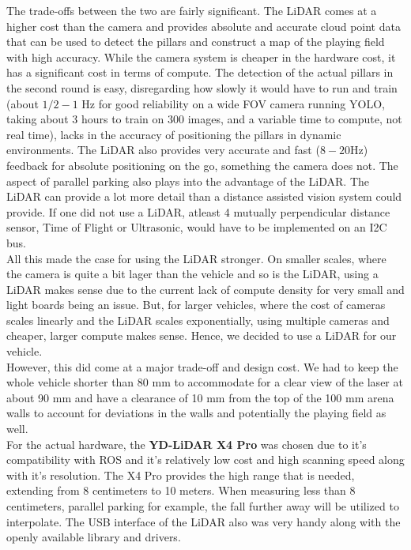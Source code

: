 \documentclass[12pt,a4paper]{article}
\begin{document}
The trade-offs between the two are fairly significant. The LiDAR comes at a higher cost than the camera and provides absolute and accurate cloud point data that can be used to detect the pillars and construct a map of the playing field with high accuracy. While the camera system is cheaper in the hardware cost, it has a significant cost in terms of compute. The detection of the actual pillars in the second round is easy, disregarding how slowly it would have to run and train (about $1/2-1$ Hz for good reliability on a wide FOV camera running YOLO, taking about 3 hours to train on 300 images, and a variable time to compute, not real time), lacks in the accuracy of positioning the pillars in dynamic environments. The LiDAR also provides very accurate and fast ($8-20$Hz) feedback for absolute positioning on the go, something the camera does not. The aspect of parallel parking also plays into the advantage of the LiDAR. The LiDAR can provide a lot more detail than a distance assisted vision system could provide. If one did not use a LiDAR, atleast 4 mutually perpendicular distance sensor, Time of Flight or Ultrasonic, would have to be implemented on an I2C bus. \\

All this made the case for using the LiDAR stronger. On smaller scales, where the camera is quite a bit lager than the vehicle and so is the LiDAR, using a LiDAR makes sense due to the current lack of compute density for very small and light boards being an issue. But, for larger vehicles, where the cost of cameras scales linearly and the LiDAR scales exponentially, using multiple cameras and cheaper, larger compute makes sense. Hence, we decided to use a LiDAR for our vehicle. \\

However, this did come at a major trade-off and design cost. We had to keep the whole vehicle shorter than 80 mm to accommodate for a clear view of the laser at about 90 mm and have a clearance of 10 mm from the top of the 100 mm arena walls to account for deviations in the walls and potentially the playing field as well. \\

For the actual hardware, the \textbf{YD-LiDAR X4 Pro} was chosen due to it's compatibility with ROS and it's relatively low cost and high scanning speed along with it's resolution. The X4 Pro provides the high range that is needed, extending from 8 centimeters to 10 meters. When measuring less than 8 centimeters, parallel parking for example, the fall further away will be utilized to interpolate. The USB interface of the LiDAR also was very handy along with the openly available library and drivers.
\end{document}
